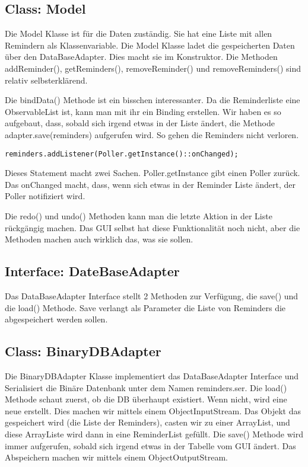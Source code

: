 \subsection{Class: Model}
Die Model Klasse ist für die Daten zuständig. Sie hat eine Liste mit allen Remindern als Klassenvariable. Die Model Klasse ladet die gespeicherten Daten über den DataBaseAdapter.
Dies macht sie im Konstruktor. Die Methoden addReminder(), getReminders(), removeReminder() und removeReminders() sind relativ selbsterklärend.

Die bindData() Methode ist ein bisschen interessanter. Da die Reminderliste eine ObservableList ist, kann man mit ihr ein Binding erstellen. Wir haben es so aufgebaut, dass, sobald
sich irgend etwas in der Liste ändert, die Methode adapter.save(reminders) aufgerufen wird. So gehen die Reminders nicht verloren.

\begin{lstlisting}
reminders.addListener(Poller.getInstance()::onChanged);
\end{lstlisting}
Dieses Statement macht zwei Sachen. Poller.getInstance gibt einen Poller zurück. Das onChanged macht, dass, wenn sich etwas in der Reminder Liste ändert, der Poller notifiziert wird.

Die redo() und undo() Methoden kann man die letzte Aktion in der Liste rückgängig machen. Das GUI selbst hat diese Funktionalität noch nicht, aber die Methoden machen auch wirklich
das, was sie sollen.


\subsection{Interface: DateBaseAdapter}
Das DataBaseAdapter Interface stellt 2 Methoden zur Verfügung, die save() und die load() Methode. Save verlangt als Parameter die Liste von Reminders die abgespeichert werden
sollen.

\subsection{Class: BinaryDBAdapter}
Die BinaryDBAdapter Klasse implementiert das DataBaseAdapter Interface und Serialisiert die Binäre Datenbank unter dem Namen reminders.ser. Die load() Methode schaut zuerst, ob die DB
überhaupt existiert. Wenn nicht, wird eine neue erstellt. Dies machen wir mittels einem ObjectInputStream. Das Objekt das gespeichert wird (die Liste der Reminders),
casten wir zu einer ArrayList, und diese ArrayListe wird dann in eine ReminderList gefüllt.
Die save() Methode wird immer aufgerufen, sobald sich irgend etwas in der Tabelle vom GUI ändert. Das Abspeichern machen wir mittels einem ObjectOutputStream.

